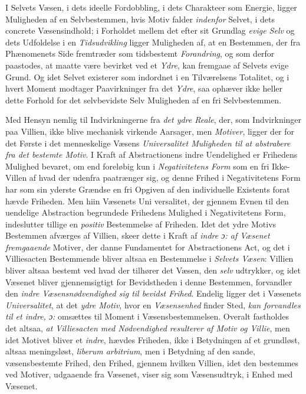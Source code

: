 I Selvets Væsen, i dets ideelle Fordobbling, i dets Charakteer som Energie,
ligger Muligheden af en Selvbestemmen, hvis Motiv falder \emph{indenfor} Selvet,
i dets concrete Væsensindhold; i Forholdet mellem det efter sit Grundlag
\emph{evige Selv} og dets Udfoldelse i en \emph{Tidsudvikling} ligger Muligheden
af, at en Bestemmen, der fra Phænomenets Side fremtræder som tidsbestemt
\emph{Forandring}, og som derfor paastodes, at maatte være bevirket ved et
\emph{Ydre}, kan fremgaae af Selvets evige Grund. Og idet Selvet existerer som
indordnet i en Tilværelsens Totalitet, og i hvert Moment modtager Paavirkninger
fra det \emph{Ydre}, saa ophæver ikke heller dette Forhold for det selvbevidste
Selv Muligheden af en fri Selvbestemmen.

Med Hensyn nemlig til Indvirkningerne fra \emph{det ydre Reale}, der, som
Indvirkninger paa Villien, ikke blive mechanisk virkende Aarsager, men
\emph{Motiver}, ligger der for det Første i det menneskelige Væsens
\emph{Universalitet Muligheden til at abstrabere fra det bestemte Motiv}. I Kraft
af Abstractionens indre Uendelighed er Frihedens Mulighed bevaret, om end
foreløbig kun i \emph{Negativitetens Form} som en fri Ikke-Villen af hvad der
udenfra paatrænger sig, og denne Frihed i Negativitetens Form har som sin yderste
Grændse en fri Opgiven af den individuelle Existents forat hævde Friheden. Men
hiin Væsenets Uni\-%
\setcounter{footnote}{0}%
versalitet, der gjennem Evnen til den uendelige Abstraction begrundede
Frihedens Mulighed i Negativitetens Form, indeslutter tillige en \emph{positiv}
Bestemmelse af Friheden. Idet det ydre Motivs Bestemmen afværges af Villien,
skeer dette i Kraft af \emph{indre ɔ: af Væsenet fremgaaende} Motiver, der danne
Fundamentet for Abstractionens Act, og det i Villiesacten Bestemmende bliver
altsaa en Bestemmelse i \emph{Selvets Væsen}: Villien bliver altsaa bestemt ved
hvad der tilhører det Væsen, den \emph{selv} udtrykker, og idet Væsenet bliver
gjennemsigtigt for Bevidstheden i denne Bestemmen, forvandler den \emph{indre
Væsensnødvendighed sig til bevidst Frihed}. Endelig ligger det i Væsenets
\emph{Universalitet}, at det \emph{ydre Motiv}, hvor en \emph{Væsensenhed}
finder Sted, \emph{kan forvandles til et indre, ɔ:} omsættes til Moment i
Væsensbestemmelsen. Overalt fastholdes det altsaa, \emph{at Villiesacten med
Nødvendighed resulterer af Motiv og Villie}, men idet Motivet bliver et
\emph{indre}, hævdes Friheden, ikke i Betydningen af et grundløst, altsaa
meningsløst, \textit{liberum arbitrium}, men i Betydning af den sande,
væsensbestemte Frihed, den Frihed, gjennem hvilken Villien, idet den bestemmes
ved Motiver, udgaaende fra Væsenet, viser sig som Væsensudtryk, i Enhed med
Væsenet.

